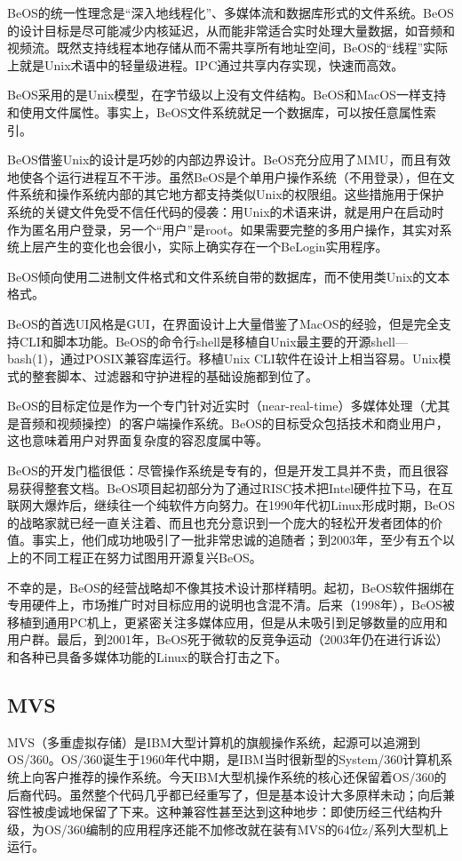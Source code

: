 \documentclass[12pt,oneside]{book}
\begin{document}
BeOS的统一性理念是“深入地线程化”、多媒体流和数据库形式的文件系统。BeOS的设计目标是尽可能减少内核延迟，从而能非常适合实时处理大量数据，如音频和视频流。既然支持线程本地存储从而不需共享所有地址空间，BeOS的“线程”实际上就是Unix术语中的轻量级进程。IPC通过共享内存实现，快速而高效。

BeOS采用的是Unix模型，在字节级以上没有文件结构。BeOS和MacOS一样支持和使用文件属性。事实上，BeOS文件系统就足一个数据库，可以按任意属性索引。

BeOS借鉴Unix的设计是巧妙的内部边界设计。BeOS充分应用了MMU，而且有效地使各个运行进程互不干涉。虽然BeOS是个单用户操作系统（不用登录），但在文件系统和操作系统内部的其它地方都支持类似Unix的权限组。这些措施用于保护系统的关键文件免受不信任代码的侵袭：用Unix的术语来讲，就是用户在启动时作为匿名用户登录，另一个“用户”是root。如果需要完整的多用户操作，其实对系统上层产生的变化也会很小，实际上确实存在一个BeLogin实用程序。

BeOS倾向使用二进制文件格式和文件系统自带的数据库，而不使用类Unix的文本格式。

BeOS的首选UI风格是GUI，在界面设计上大量借鉴了MacOS的经验，但是完全支持CLI和脚本功能。BeOS的命令行shell是移植自Unix最主要的开源shell—bash(1)，通过POSIX兼容库运行。移植Unix CLI软件在设计上相当容易。Unix模式的整套脚本、过滤器和守护进程的基础设施都到位了。

BeOS的目标定位是作为一个专门针对近实时（near-real-time）多媒体处理（尤其是音频和视频操控）的客户端操作系统。BeOS的目标受众包括技术和商业用户，这也意味着用户对界面复杂度的容忍度属中等。

BeOS的开发门槛很低：尽管操作系统是专有的，但是开发工具并不贵，而且很容易获得整套文档。BeOS项目起初部分为了通过RISC技术把Intel硬件拉下马，在互联网大爆炸后，继续往一个纯软件方向努力。在1990年代初Linux形成时期，BeOS的战略家就已经一直关注着、而且也充分意识到一个庞大的轻松开发者团体的价值。事实上，他们成功地吸引了一批非常忠诚的追随者；到2003年，至少有五个以上的不同工程正在努力试图用开源复兴BeOS。

不幸的是，BeOS的经营战略却不像其技术设计那样精明。起初，BeOS软件捆绑在专用硬件上，市场推广时对目标应用的说明也含混不清。后来（1998年），BeOS被移植到通用PC机上，更紧密关注多媒体应用，但是从未吸引到足够数量的应用和用户群。最后，到2001年，BeOS死于微软的反竞争运动（2003年仍在进行诉讼）和各种已具备多媒体功能的Linux的联合打击之下。

\subsection{MVS}
MVS（多重虚拟存储）是IBM大型计算机的旗舰操作系统，起源可以追溯到OS/360。OS/360诞生于1960年代中期，是IBM当时很新型的System/360计算机系统上向客户推荐的操作系统。今天IBM大型机操作系统的核心还保留着OS/360的后裔代码。虽然整个代码几乎都已经重写了，但是基本设计大多原样未动；向后兼容性被虔诚地保留了下来。这种兼容性甚至达到这种地步：即使历经三代结构升级，为OS/360编制的应用程序还能不加修改就在装有MVS的64位z/系列大型机上运行。
\end{document}
